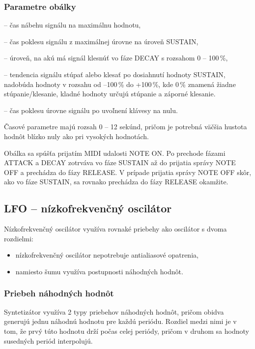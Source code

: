 \subsubsection{Parametre obálky}
\begin{description}
\setlength{\itemsep}{-0.5ex}
\item[Attack] -- čas nábehu signálu na maximálnu hodnotu,
\item[Decay] -- čas poklesu signálu z maximálnej úrovne na úroveň SUSTAIN,
\item[Sustain] -- úroveň, na akú má signál klesnúť vo fáze DECAY s rozsahom 0 -- 100\,\%,
\item[Time] -- tendencia signálu stúpať alebo klesať po dosiahnutí hodnoty SUSTAIN, nadobúda hodnoty v rozsahu od --100\,\% do +100\,\%, kde 0\,\% znamená žiadne stúpanie/klesanie, kladné hodnoty určujú stúpanie a záporné klesanie.
\item[Release] -- čas poklesu úrovne signálu po uvoľnení klávesy na nulu.
\end{description}

Časové parametre majú rozsah 0 -- 12 sekúnd, pričom je potrebná väčšia hustota hodnôt blízko nuly ako pri vysokých hodnotách.

Obálka sa spúšťa prijatím MIDI udalosti NOTE ON. Po prechode fázami ATTACK a DECAY zotrváva vo fáze SUSTAIN až do prijatia správy NOTE OFF a prechádza do fázy RELEASE. V prípade prijatia správy NOTE OFF skôr, ako vo fáze SUSTAIN, sa rovnako prechádza do fázy RELEASE okamžite.

\subsection{LFO -- nízkofrekvenčný oscilátor}

Nízkofrekvenčný oscilátor využíva rovnaké priebehy ako oscilátor s dvoma rozdielmi:
\begin{itemize}
\setlength{\itemsep}{-0.5ex}
\item nízkofrekvenčný oscilátor nepotrebuje antialiasové opatrenia,
\item namiesto šumu využíva postupnosti náhodných hodnôt.
\end{itemize}

\subsubsection*{Priebeh náhodných hodnôt}

Syntetizátor využíva 2 typy priebehov náhodných hodnôt, pričom obidva generujú jednu náhodnú hodnotu pre každú periódu. Rozdiel medzi nimi je v tom, že prvý túto hodnotu drží počas celej periódy, pričom v druhom sa hodnoty susedných periód interpolujú.

